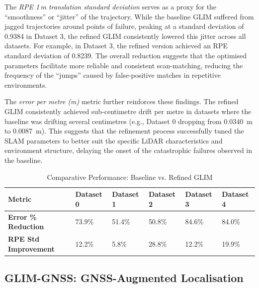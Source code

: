 The \textit{RPE 1\,m translation standard deviation} serves as a proxy for the ``smoothness'' or ``jitter'' of the trajectory. While the baseline GLIM suffered from jagged trajectories around points of failure, peaking at a standard deviation of 0.9384 in Dataset 3, the refined GLIM consistently lowered this jitter across all datasets. For example, in Dataset 3, the refined version achieved an RPE standard deviation of 0.8239. The overall reduction suggests that the optimised parameters facilitate more reliable and consistent scan-matching, reducing the frequency of the ``jumps'' caused by false-positive matches in repetitive environments.

The \textit{error per metre (m)} metric further reinforces these findings. The refined GLIM consistently achieved sub-centimetre drift per metre in datasets where the baseline was drifting several centimetres (e.g., Dataset 0 dropping from 0.0340~m to 0.0087~m). This suggests that the refinement process successfully tuned the SLAM parameters to better suit the specific LiDAR characteristics and environment structure, delaying the onset of the catastrophic failures observed in the baseline.

\begin{table}[htbp]
\centering
\caption{Comparative Performance: Baseline vs. Refined GLIM}
\label{tab:comparison_summary}
\begin{tabularx}{\textwidth}{lXXXXX}
\toprule
\textbf{Metric} & \textbf{Dataset 0} & \textbf{Dataset 1} & \textbf{Dataset 2} & \textbf{Dataset 3} & \textbf{Dataset 4} \\ \midrule
\textbf{Error \% Reduction} & 73.9\% & 51.4\% & 50.8\% & 84.6\% & 84.0\% \\
\textbf{RPE Std Improvement} & 12.2\% & 5.8\% & 28.8\% & 12.2\% & 19.9\% \\ \bottomrule
\end{tabularx}
\end{table}

\subsection{GLIM-GNSS: GNSS-Augmented Localisation}

